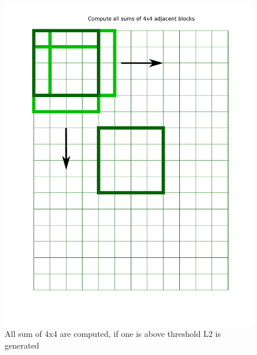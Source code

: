 \documentclass{article}
\begin{document}
\begin{figure}
  \centering
 \includegraphics[width=\textwidth]{figs/HCALSum.pdf}
  \caption{All sum of 4x4 are computed, if one is above threshold L2 is generated }
\end{figure}
\end{document}
